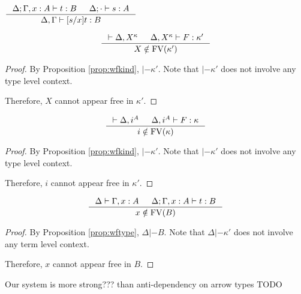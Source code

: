 \begin{lemma}\label{lem:tmsubst}
$ \inference{\Delta;\Gamma,x:A |- t:B & \Delta;\cdot |- s:A}
	{\Delta,\Gamma |- [s/x]t:B} $
\end{lemma}



\begin{proposition}
\[ \inference{ |- \Delta,X^\kappa
             & \Delta,X^\kappa |- F : \kappa' }
             { X\notin\FV(\kappa') }
\]
\end{proposition}
\begin{proof}
	By Proposition \ref{prop:wfkind}, $|- \kappa'$.
	Note that $|- \kappa'$ does not involve any type level context.

	Therefore, $X$ cannot appear free in $\kappa'$.
\end{proof}

\begin{proposition}
\[ \inference{ |- \Delta,i^A
             & \Delta,i^A |- F : \kappa }
             { i\notin\FV(\kappa) }
\]
\end{proposition}
\begin{proof}
	By Proposition \ref{prop:wfkind}, $|- \kappa'$.
	Note that $|- \kappa'$ does not involve any type level context.

	Therefore, $i$ cannot appear free in $\kappa'$.
\end{proof}

\begin{proposition}
\[ \inference{ \Delta |- \Gamma,x:A
             & \Delta;\Gamma,x:A |- t : B }
             { x\notin\FV(B) }
\]
\end{proposition}
\begin{proof}
	By Proposition \ref{prop:wftype}, $\Delta |- B$.
	Note that $\Delta |- \kappa'$ does not involve any term level context.

	Therefore, $x$ cannot appear free in $B$.
\end{proof}


\begin{remark} Our system is more strong??? than anti-dependency on arrow types
TODO
\end{remark}

